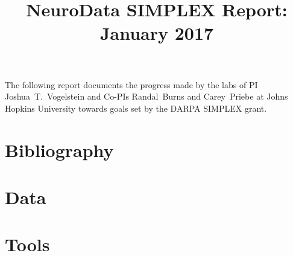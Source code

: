 \documentclass[12pt]{article}
\title{NeuroData SIMPLEX Report: January 2017}
\begin{document}
\renewcommand{\onlyinsubfile}[1]{}
\renewcommand{\notinsubfile}[1]{#1}
\maketitle
\thispagestyle{empty}

The following report documents the progress made by the labs of PI Joshua~T.~Vogelstein and Co-PIs Randal~Burns and Carey~Priebe at Johns Hopkins University towards goals set by the DARPA SIMPLEX grant.

\setcounter{tocdepth}{2}
\tableofcontents


\newpage 
\section{Bibliography}
\begin{spacing}{0.5}
{\footnotesize
{}
 
 
}
\end{spacing}

\newpage 
\section{Data}

%


\newpage
\section{Tools}

%


\clearpage

\clearpage
%

\clearpage
%

\clearpage

\clearpage

\clearpage

\clearpage

\clearpage

\clearpage

\clearpage

\clearpage

\clearpage

\clearpage

\clearpage

\clearpage

\clearpage

\clearpage



\newpage
\begin{spacing}{0.5}
{\footnotesize
}
\end{spacing}

\end{document}
